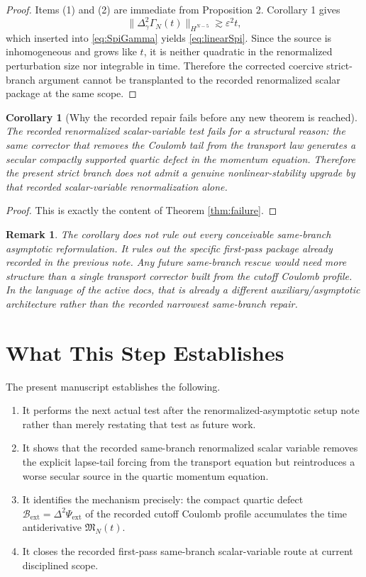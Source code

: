 \documentclass[11pt]{article}
\newtheorem{remark}{Remark}
\newtheorem{corollary}{Corollary}
\begin{document}
\begin{proof}
Items (1) and (2) are immediate from Proposition 2. Corollary 1 gives
\[
\|\Delta_\gamma^2\Gamma_N(t)\|_{H^{N-5}}
\gtrsim
\varepsilon^2 t,
\]
which inserted into \eqref{eq:SpiGamma} yields \eqref{eq:linearSpi}. Since the source is inhomogeneous and grows like \(t\), it is neither quadratic in the renormalized perturbation size nor integrable in time. Therefore the corrected coercive strict-branch argument cannot be transplanted to the recorded renormalized scalar package at the same scope.
\end{proof}

\begin{corollary}[Why the recorded repair fails before any new theorem is reached]
The recorded renormalized scalar-variable test fails for a structural reason: the same corrector that removes the Coulomb tail from the transport law generates a secular compactly supported quartic defect in the momentum equation. Therefore the present strict branch does not admit a genuine nonlinear-stability upgrade by that recorded scalar-variable renormalization alone.
\end{corollary}

\begin{proof}
This is exactly the content of Theorem \ref{thm:failure}.
\end{proof}

\begin{remark}
The corollary does \emph{not} rule out every conceivable same-branch asymptotic reformulation. It rules out the specific first-pass package already recorded in the previous note. Any future same-branch rescue would need more structure than a single transport corrector built from the cutoff Coulomb profile. In the language of the active docs, that is already a different auxiliary/asymptotic architecture rather than the recorded narrowest same-branch repair.
\end{remark}

\section{What This Step Establishes}

The present manuscript establishes the following.
\begin{enumerate}
    \item It performs the next actual test after the renormalized-asymptotic setup note rather than merely restating that test as future work.
    \item It shows that the recorded same-branch renormalized scalar variable removes the explicit lapse-tail forcing from the transport equation but reintroduces a worse secular source in the quartic momentum equation.
    \item It identifies the mechanism precisely: the compact quartic defect \(\mathcal B_{\mathrm{ext}}=\Delta^2\Psi_{\mathrm{ext}}\) of the recorded cutoff Coulomb profile accumulates the time antiderivative \(\mathfrak M_N(t)\).
    \item It closes the recorded first-pass same-branch scalar-variable route at current disciplined scope.
\end{enumerate}
\end{document}
